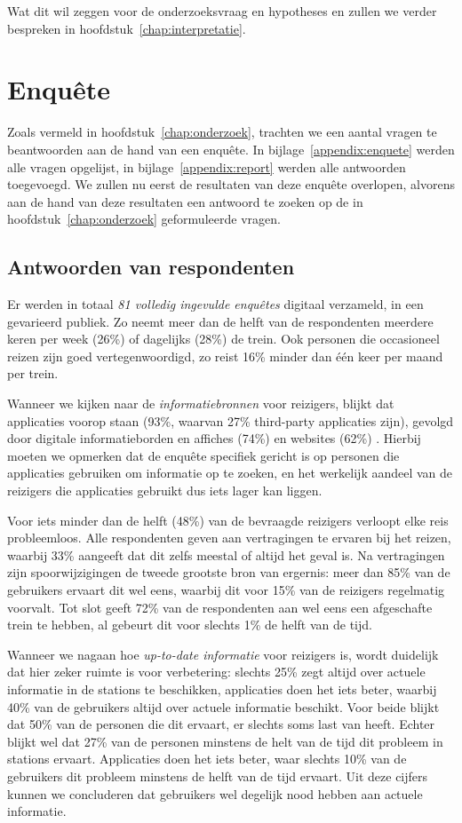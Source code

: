 Wat dit wil zeggen voor de onderzoeksvraag en hypotheses en zullen we verder bespreken in hoofdstuk~\ref{chap:interpretatie}.

\section{Enquête}
Zoals vermeld in hoofdstuk~\ref{chap:onderzoek}, trachten we een aantal vragen te beantwoorden aan de hand van een enquête. In bijlage~\ref{appendix:enquete} werden alle vragen opgelijst, in bijlage~\ref{appendix:report} werden alle antwoorden toegevoegd. We zullen nu eerst de resultaten van deze enquête overlopen, alvorens aan de hand van deze resultaten een antwoord te zoeken op de in hoofdstuk~\ref{chap:onderzoek} geformuleerde vragen.

\subsection{Antwoorden van respondenten}
Er werden in totaal \emph{81 volledig ingevulde enquêtes} digitaal verzameld, in een gevarieerd publiek. Zo neemt meer dan de helft van de respondenten meerdere keren per week (26\%) of dagelijks (28\%) de trein. Ook personen die occasioneel reizen zijn goed vertegenwoordigd, zo reist 16\% minder dan één keer per maand per trein.

Wanneer we kijken naar de \emph{informatiebronnen} voor reizigers, blijkt dat  applicaties voorop staan (93\%, waarvan 27\% third-party applicaties zijn), gevolgd door digitale informatieborden en affiches (74\%) en websites (62\%) . Hierbij moeten we opmerken dat de enquête specifiek gericht is op personen die applicaties gebruiken om informatie op te zoeken, en het werkelijk aandeel van de reizigers die applicaties gebruikt dus iets lager kan liggen.

Voor iets minder dan de helft (48\%) van de bevraagde reizigers verloopt elke reis probleemloos. Alle respondenten geven aan vertragingen te ervaren bij het reizen, waarbij 33\% aangeeft dat dit zelfs meestal of altijd het geval is. Na vertragingen zijn spoorwijzigingen de tweede grootste bron van ergernis: meer dan 85\% van de gebruikers ervaart dit wel eens, waarbij dit voor 15\% van de reizigers regelmatig voorvalt. Tot slot geeft 72\% van de respondenten aan wel eens een afgeschafte trein te hebben, al gebeurt dit voor slechts 1\% de helft van de tijd.

Wanneer we nagaan hoe \emph{up-to-date informatie} voor reizigers is, wordt duidelijk dat hier zeker ruimte is voor verbetering: slechts 25\% zegt altijd over actuele informatie in de stations te beschikken, applicaties doen het iets beter, waarbij 40\% van de gebruikers altijd over actuele informatie beschikt. Voor beide blijkt dat 50\% van de personen die dit ervaart, er slechts soms last van heeft. Echter blijkt wel dat 27\% van de personen minstens de helt van de tijd dit probleem in stations ervaart. Applicaties doen het iets beter, waar slechts 10\% van de gebruikers dit probleem minstens de helft van de tijd ervaart. Uit deze cijfers kunnen we concluderen dat gebruikers wel degelijk nood hebben aan actuele informatie. 

